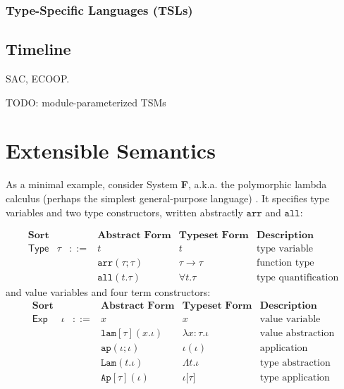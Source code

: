 \subsubsection{Type-Specific Languages (TSLs)}\label{sec:tsls}

\subsection{Timeline}\label{sec:syntax-timeline}
SAC, ECOOP.

TODO: module-parameterized TSMs

\section{Extensible Semantics}\label{sec:extensible-semantics}
As a minimal example, consider System \textbf{F}, a.k.a. the polymorphic lambda calculus (perhaps the simplest general-purpose language) \cite{girard1971extension,Reynolds94anintroduction,pfpl}. It specifies type variables and two type constructors, written abstractly $\mathtt{arr}$ and $\mathtt{all}$:

\[
\begin{array}{llllll}
\textbf{Sort} & & & \textbf{Abstract Form} & \textbf{Typeset Form} & \textbf{Description}\\
\mathsf{Type} & \tau & ::= & t & t & \text{type variable}\\
& & & \mathtt{arr}(\tau; \tau) & \tau \rightarrow \tau & \text{function type}\\
& & & \mathtt{all}(t.\tau) & \forall t.\tau & \text{type quantification}
\end{array}
\]
and value variables and four term constructors:
\[
\begin{array}{llllll}
\textbf{Sort} & & & \textbf{Abstract Form} & \textbf{Typeset Form} & \textbf{Description}\\
\mathsf{Exp} & \iota & ::= & x & x & \text{value variable}\\
& & & \mathtt{lam}[\tau](x.\iota) & \lambda x{:}\tau.\iota & \text{value abstraction}\\
& & & \mathtt{ap}(\iota; \iota) & \iota(\iota) & \text{application}\\
& & & \mathtt{Lam}(t.\iota) & \Lambda t.\iota & \text{type abstraction}\\
& & & \mathtt{Ap}[\tau](\iota) & \iota\mathtt{[}\tau\mathtt{]} & \text{type application}
\end{array}
\]

